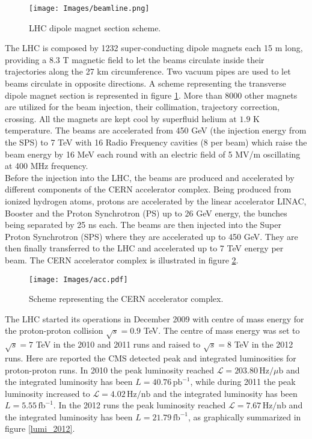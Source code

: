 \begin{figure}
\centering
\texttt{[image: Images/beamline.png]}
\caption{LHC dipole magnet section scheme.}
\label{beamline}
\end{figure}
The LHC is composed by 1232 super-conducting dipole magnets each 15 m
long, providing a $8.3$ T magnetic field to let the beams circulate inside their trajectories 
along the 27 km circumference. Two vacuum pipes are used to let beams
circulate in opposite directions. A scheme representing the transverse dipole magnet 
section is represented in figure \ref{beamline}. More than 8000 other magnets are utilized
for the beam injection, their collimation, trajectory correction, crossing. All the
magnets are kept cool by superfluid helium at $1.9$ K temperature.
The beams are accelerated from 450 GeV (the injection energy from the SPS) to 7
TeV with 16 Radio Frequency cavities (8 per beam) which raise the beam energy
by 16 MeV each round with an electric field of 5 MV/m oscillating at 400 MHz
frequency.\\
Before the injection into the LHC, the beams are produced and accelerated by
different components of the CERN accelerator complex. Being produced from
ionized hydrogen atoms, protons are accelerated by the linear accelerator LINAC,
Booster and the Proton Synchrotron (PS) up to 26 GeV energy, the bunches being
separated by 25 ns each. The beams are then injected into the Super Proton Synchrotron 
(SPS) where they are accelerated up to 450 GeV. They are then finally
transferred to the LHC and accelerated up to 7 TeV energy per beam. The CERN
accelerator complex is illustrated in figure \ref{acc}.
\begin{figure}
\centering
\texttt{[image: Images/acc.pdf]}
\caption{Scheme representing the CERN accelerator complex.}
\label{acc}
\end{figure}

The LHC started its operations in December 2009 with centre of mass energy for the proton-proton collision
$\sqrt{s} = 0.9$ TeV. The centre of mass energy was set to $\sqrt{s} = 7$ TeV in the 2010 and 2011 runs and raised to $\sqrt{s} = 8$ TeV in the 2012 runs. Here are reported the CMS detected peak and integrated luminosities for proton-proton runs.
In 2010 the peak luminosity reached $\mathcal{L}=203.80\,\mathrm{Hz}/\mu\mathrm{b}$ and the integrated luminosity has been $L=40.76\,\mathrm{pb}^{-1}$, while during 2011 the peak luminosity increased to $\mathcal{L}=4.02\,\mathrm{Hz}/\mathrm{nb}$ and the integrated luminosity has been $L=5.55\,\mathrm{fb}^{-1}$.
In the 2012 runs the peak luminosity reached $\mathcal{L}=7.67\,\mathrm{Hz}/\mathrm{nb}$ and the integrated luminosity has been $L=21.79\,\mathrm{fb}^{-1}$, as graphically summarized in figure \ref{lumi_2012}.

